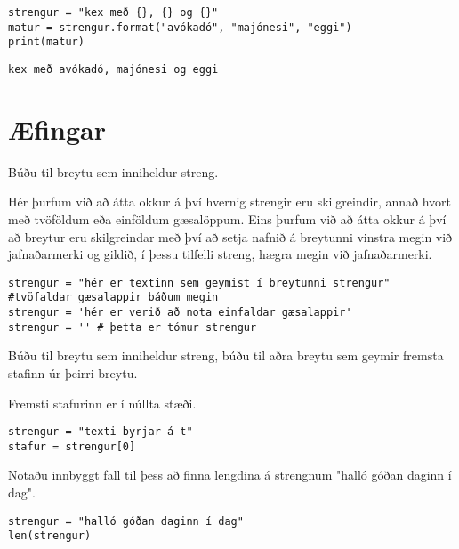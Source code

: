 \begin{lstlisting}[caption=Aðferðin .format() kynnt, label=lst:str-format]
strengur = "kex með {}, {} og {}"
matur = strengur.format("avókadó", "majónesi", "eggi")
print(matur)
\end{lstlisting}
\lstset{style=uttak}
\begin{lstlisting}
kex með avókadó, majónesi og eggi
\end{lstlisting}
\lstset{style=venjulegt}


\newpage
\section{Æfingar}
\begin{exercise}\label{str1}
	Búðu til breytu sem inniheldur streng.
\end{exercise}
\begin{Answer}[ref={str1}]
	Hér þurfum við að átta okkur á því hvernig strengir eru skilgreindir, annað hvort með tvöföldum eða einföldum gæsalöppum.
	Eins þurfum við að átta okkur á því að breytur eru skilgreindar með því að setja nafnið á breytunni vinstra megin við jafnaðarmerki og gildið, í þessu tilfelli streng, hægra megin við jafnaðarmerki.
	\begin{lstlisting}
strengur = "hér er textinn sem geymist í breytunni strengur" #tvöfaldar gæsalappir báðum megin
strengur = 'hér er verið að nota einfaldar gæsalappir'
strengur = '' # þetta er tómur strengur\end{lstlisting}
\end{Answer}

\begin{exercise}\label{str2}
	Búðu til breytu sem inniheldur streng, búðu til aðra breytu sem geymir fremsta stafinn úr þeirri breytu.
\end{exercise}
\begin{Answer}[ref={str2}]
	Fremsti stafurinn er í núllta stæði.
	\begin{lstlisting}
strengur = "texti byrjar á t"
stafur = strengur[0]\end{lstlisting}
\end{Answer}

\begin{exercise}\label{str3}
	Notaðu innbyggt fall til þess að finna lengdina á strengnum "halló góðan daginn í dag".
\end{exercise}
\begin{Answer}[ref={str3}]
	\begin{lstlisting}
strengur = "halló góðan daginn í dag"
len(strengur)\end{lstlisting}
\end{Answer}

